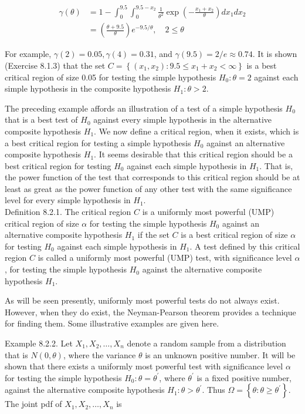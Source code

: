 $$
\begin{aligned}
\gamma(\theta) & =1-\int_{0}^{9.5} \int_{0}^{9.5-x_{2}} \frac{1}{\theta^{2}} \exp \left(-\frac{x_{1}+x_{2}}{\theta}\right) d x_{1} d x_{2} \\
& =\left(\frac{\theta+9.5}{\theta}\right) e^{-9.5 / \theta}, \quad 2 \leq \theta
\end{aligned}
$$

For example, $\gamma(2)=0.05, \gamma(4)=0.31$, and $\gamma(9.5)=2 / e \approx 0.74$. It is shown (Exercise 8.1.3) that the set $C=\left\{\left(x_{1}, x_{2}\right): 9.5 \leq x_{1}+x_{2}<\infty\right\}$ is a best critical region of size 0.05 for testing the simple hypothesis $H_{0}: \theta=2$ against each simple hypothesis in the composite hypothesis $H_{1}: \theta>2$.

The preceding example affords an illustration of a test of a simple hypothesis $H_{0}$ that is a best test of $H_{0}$ against every simple hypothesis in the alternative composite hypothesis $H_{1}$. We now define a critical region, when it exists, which is a best critical region for testing a simple hypothesis $H_{0}$ against an alternative composite hypothesis $H_{1}$. It seems desirable that this critical region should be a best critical region for testing $H_{0}$ against each simple hypothesis in $H_{1}$. That is, the power function of the test that corresponds to this critical region should be at least as great as the power function of any other test with the same significance level for every simple hypothesis in $H_{1}$.\\
Definition 8.2.1. The critical region $C$ is a uniformly most powerful (UMP) critical region of size $\alpha$ for testing the simple hypothesis $H_{0}$ against an alternative composite hypothesis $H_{1}$ if the set $C$ is a best critical region of size $\alpha$ for testing $H_{0}$ against each simple hypothesis in $H_{1}$. A test defined by this critical region $C$ is called a uniformly most powerful (UMP) test, with significance level $\alpha$, for testing the simple hypothesis $H_{0}$ against the alternative composite hypothesis $H_{1}$.

As will be seen presently, uniformly most powerful tests do not always exist. However, when they do exist, the Neyman-Pearson theorem provides a technique for finding them. Some illustrative examples are given here.

Example 8.2.2. Let $X_{1}, X_{2}, \ldots, X_{n}$ denote a random sample from a distribution that is $N(0, \theta)$, where the variance $\theta$ is an unknown positive number. It will be shown that there exists a uniformly most powerful test with significance level $\alpha$ for testing the simple hypothesis $H_{0}: \theta=\theta^{\prime}$, where $\theta^{\prime}$ is a fixed positive number, against the alternative composite hypothesis $H_{1}: \theta>\theta^{\prime}$. Thus $\Omega=\left\{\theta: \theta \geq \theta^{\prime}\right\}$. The joint pdf of $X_{1}, X_{2}, \ldots, X_{n}$ is

